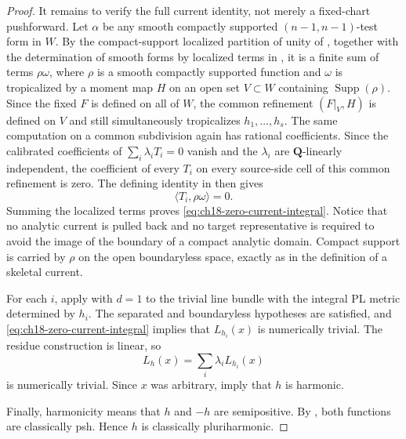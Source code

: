 \begin{proof}
It remains to verify the full current identity, not merely a fixed-chart
pushforward.  Let $\alpha$ be any smooth compactly supported
$(n-1,n-1)$-test form in $W$.  By the compact-support localized partition of
unity of \cite[Corollary~6.2.8]{CLD25}, together with the determination of
smooth forms by localized terms in \cite[Remark~7.2.5]{CLD25}, it is a
finite sum of terms $\rho\omega$, where $\rho$ is a smooth compactly
supported function and $\omega$ is tropicalized by a moment map $H$ on an
open set $V\subset W$ containing
$\operatorname{Supp}(\rho)$.  Since the fixed $F$ is defined on all of $W$,
the common refinement $(F|_V,H)$ is defined on $V$ and still simultaneously
tropicalizes $h_1,\ldots,h_s$.  The same computation on a common subdivision
again has rational coefficients.  Since the calibrated coefficients of
$\sum_i\lambda_iT_i=0$ vanish and the $\lambda_i$ are $\mathbf Q$-linearly
independent, the coefficient of every $T_i$ on every source-side cell of
this common refinement is zero.  The defining identity in
\cite[Definition~7.5.1]{CLD25} then gives
\[
                         \langle T_i,\rho\omega\rangle=0.
\]
Summing the localized terms proves \eqref{eq:ch18-zero-current-integral}.
Notice that no analytic current is pulled back and no target representative
is required to avoid the image of the boundary of a compact analytic
domain.  Compact support is carried by $\rho$ on the open boundaryless
space, exactly as in the definition of a skeletal current.

For each $i$, apply \cite[Theorem~18.8.4]{CLD25} with $d=1$ to the trivial
line bundle with the integral PL metric determined by $h_i$.  The separated
and boundaryless hypotheses are satisfied, and
\eqref{eq:ch18-zero-current-integral} implies that $L_{h_i}(x)$ is
numerically trivial.  The residue construction is linear, so
\[
                         L_h(x)=\sum_i\lambda_iL_{h_i}(x)
\]
is numerically trivial.  Since $x$ was arbitrary,
\cite[Proposition~7.1 and Definition~7.2]{GJR26} imply that $h$ is harmonic.

Finally, harmonicity means that $h$ and $-h$ are semipositive.  By
, both functions are classically psh.  Hence $h$
is classically pluriharmonic.
\end{proof}
